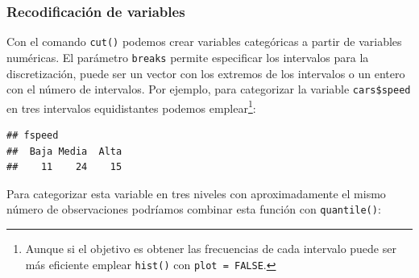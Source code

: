 \documentclass[
]{book}
\newenvironment{Shaded}{\begin{snugshade}}{\end{snugshade}}
\newcommand{\AttributeTok}[1]{\textcolor[rgb]{0.13,0.29,0.53}{#1}}
\newcommand{\DecValTok}[1]{\textcolor[rgb]{0.00,0.00,0.81}{#1}}
\newcommand{\FunctionTok}[1]{\textcolor[rgb]{0.13,0.29,0.53}{\textbf{#1}}}
\newcommand{\NormalTok}[1]{#1}
\newcommand{\OtherTok}[1]{\textcolor[rgb]{0.56,0.35,0.01}{#1}}
\newcommand{\SpecialCharTok}[1]{\textcolor[rgb]{0.81,0.36,0.00}{\textbf{#1}}}
\newcommand{\StringTok}[1]{\textcolor[rgb]{0.31,0.60,0.02}{#1}}
\begin{document}
\subsubsection{Recodificación de variables}\label{recodificaciuxf3n-de-variables}

Con el comando \texttt{cut()} podemos crear variables categóricas a partir de variables numéricas.
El parámetro \texttt{breaks} permite especificar los intervalos para la discretización, puede ser un vector con los extremos de los intervalos o un entero con el número de intervalos.
Por ejemplo, para categorizar la variable \texttt{cars\$speed} en tres intervalos equidistantes podemos emplear\footnote{Aunque si el objetivo es obtener las frecuencias de cada intervalo puede ser más eficiente emplear \texttt{hist()} con \texttt{plot\ =\ FALSE}.}:

\begin{Shaded}
\end{Shaded}

\begin{verbatim}
## fspeed
##  Baja Media  Alta 
##    11    24    15
\end{verbatim}

Para categorizar esta variable en tres niveles con aproximadamente el mismo número de observaciones podríamos combinar esta función con \texttt{quantile()}:

\begin{Shaded}
\end{Shaded}
\end{document}
